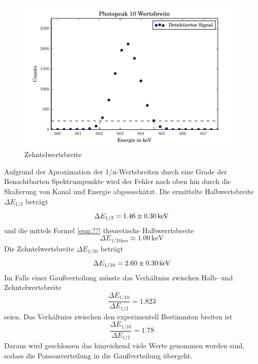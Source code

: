 \begin{figure}[h]
  \centering
  \includegraphics[width=\textwidth]{./build/10Wertsbreite.pdf}
  \caption{Zehntelwertsbreite}
  \label{fig:Zehntel}
\end{figure}
Aufgrund der Aproximation der 1/n-Wertsbreiten durch eine Grade der Benachtbarten Spektrumpunkte wird der Fehler nach oben hin durch die Skalierung von Kanal und Energie abgessschätzt. Die ermittelte Halbwertsbreite $\Delta E_{1/2}$ beträgt
\begin{equation}
  \Delta E_{1/2} = \num{1.46 +- 0.30} \, \text{keV}
\end{equation}
und die mittels Formel \ref{eqn:??} theoretische Halbwerrtsbreite
\begin{equation}
  \Delta E_{1/2 \text{theo}} \approx 1.00 \, \text{keV}
  \label{eqn:HalbTheo}
\end{equation}
Die Zehntelwertsbreite $\Delta E_{1/10}$ beträgt
\begin{equation}
  \Delta E_{1/10} = \num{2.60 +- 0.30} \, \text{keV}
\end{equation}
Im Falle einer Gaußverteilung müsste das Verhältniss zwischen Halb- und Zehntelwertsbreite
\begin{equation}
  \frac{\Delta E_{1/10}}{\Delta E_{1/2}} = 1.823 
\end{equation}
seien. Das Verhältniss zwischen den experimentell Bestimmten breiten ist
\begin{equation}
  \frac{\Delta E_{1/10}}{\Delta E_{1/2}} = 1.78 
  \label{eqn:Ver}
\end{equation}
Daraus wird geschlossen das hinreichend viele Werte genommen worden sind, sodass die Poissonverteilung in die Gaußverteilung übergeht.

